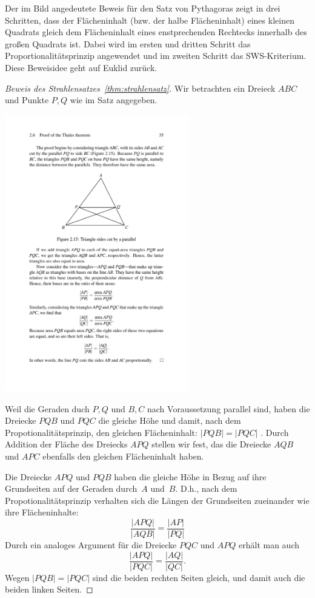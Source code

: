Der im Bild angedeutete Beweis für den Satz von Pythagoras zeigt in
drei Schritten, dass der Flächeninhalt (bzw. der halbe Flächeninhalt) eines kleinen Quadrats
gleich dem Flächeninhalt eines enstprechenden Rechtecks innerhalb des
großen Quadrats ist. Dabei wird im ersten und dritten Schritt das
Proportionalitätsprinzip angewendet und im zweiten Schritt das
SWS-Kriterium. Diese Beweisidee geht auf Euklid zurück.






\begin{proof}[Beweis des Strahlensatzes~\ref{thm:strahlensatz}]
Wir betrachten ein Dreieck $ABC$ und Punkte $P,Q$ wie im Satz
angegeben. %

\centerline{\includegraphics[width=8cm]{BILDER/BildBeweisStrahlensatz.pdf}}


Weil die Geraden duch $P,Q$ und $B,C$ nach Voraussetzung parallel sind, haben die
Dreiecke $PQB$ und $PQC$ die gleiche Höhe und damit, nach dem
Propotionalitätsprinzip, 
den gleichen Flächeninhalt: $|PQB|=|PQC|$ . 
Durch Addition der Fläche des Dreiecks $APQ$
stellen wir fest, das die Dreiecke $AQB$ und $APC$ ebenfalls den
gleichen Flächeninhalt haben.


Die Dreiecke $APQ$ und $PQB$ haben die gleiche Höhe in Bezug auf ihre
Grundseiten auf der Geraden durch~$A$ und~$B$. D.h., nach dem 
Propotionalitätsprinzip verhalten sich die Längen der Grundseiten
zueinander wie ihre Flächeninhalte:
$$
\frac{|APQ|}{|AQB|}
=
\frac{|AP|}{|PQ|}
$$
Durch ein analoges Argument für die Dreiecke $PQC$ und $APQ$ erhält man auch
$$
\frac{|APQ|}{|PQC|}
=
\frac{|AQ|}{|QC|}
.
$$
Wegen $|PQB|=|PQC|$ sind die beiden rechten Seiten gleich, und damit
auch die beiden linken Seiten.
\end{proof}



